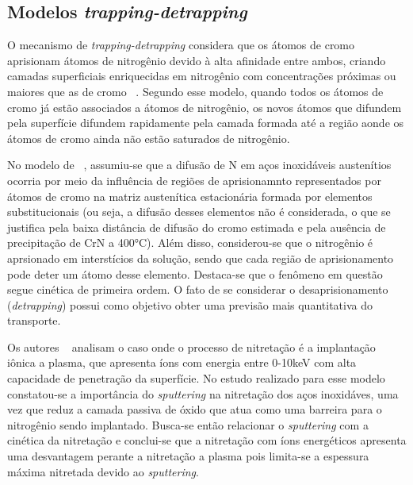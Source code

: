 \documentclass[]{politex}
\begin{document}
\subsection{Modelos \textit{trapping-detrapping}}
\label{sec:trap-detrap}
	O mecanismo de \textit{trapping-detrapping} considera que os átomos de cromo aprisionam átomos de nitrogênio devido à alta afinidade entre ambos, criando camadas superficiais enriquecidas em nitrogênio com concentrações próximas ou maiores que as de cromo ~\cite{parascandola2000nitrogen}. Segundo esse modelo, quando todos os átomos de cromo já estão associados a átomos de nitrogênio, os novos átomos que difundem pela superfície difundem rapidamente pela camada formada até a região aonde os átomos de cromo ainda não estão saturados de nitrogênio.  \par
	No modelo de ~\cite{parascandola2000nitrogen}, assumiu-se que a difusão de N em aços inoxidáveis austenítios ocorria por meio da influência de regiões de aprisionamnto representados por átomos de cromo na matriz austenítica estacionária formada por elementos substitucionais (ou seja, a difusão desses elementos não é considerada, o que se justifica pela baixa distância de difusão do cromo estimada e pela ausência de precipitação de CrN a 400°C). Além disso, considerou-se que o nitrogênio é aprsionado em interstícios da solução, sendo que cada região de aprisionamento pode deter um átomo desse elemento. Destaca-se que o fenômeno em questão segue cinética de primeira ordem. O fato de se considerar o desaprisionamento (\textit{detrapping}) possui como objetivo obter uma previsão mais quantitativa do transporte. \par
	Os autores ~\cite{moller2001surface} analisam o caso onde o processo de nitretação é a implantação iônica a plasma, que apresenta íons com energia entre 0-10keV com alta capacidade de penetração da superfície. No estudo realizado para esse modelo constatou-se a importância do \textit{sputtering} na nitretação dos aços inoxidáves, uma vez que reduz a camada passiva de óxido que atua como uma barreira para o nitrogênio sendo implantado. Busca-se então relacionar o \textit{sputtering} com a cinética da nitretação e conclui-se que a nitretação com íons energéticos apresenta uma desvantagem perante a nitretação a plasma pois limita-se a espessura máxima nitretada devido ao \textit{sputtering}. \par
\end{document}
